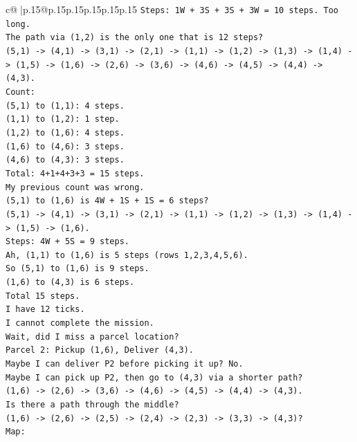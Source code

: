 \documentclass{article}
\begin{document}
{\begin{supertabular}{c@{$\;$}|p{.15\linewidth}@{}p{.15\linewidth}p{.15\linewidth}p{.15\linewidth}p{.15\linewidth}p{.15\linewidth}}
{{{\texttt{Steps: 1W + 3S + 3S + 3W = 10 steps. Too long.} \\
\texttt{The path via (1,2) is the only one that is 12 steps?} \\
\texttt{(5,1) {-}> (4,1) {-}> (3,1) {-}> (2,1) {-}> (1,1) {-}> (1,2) {-}> (1,3) {-}> (1,4) {-}> (1,5) {-}> (1,6) {-}> (2,6) {-}> (3,6) {-}> (4,6) {-}> (4,5) {-}> (4,4) {-}> (4,3).} \\
\texttt{Count:} \\
\texttt{(5,1) to (1,1): 4 steps.} \\
\texttt{(1,1) to (1,2): 1 step.} \\
\texttt{(1,2) to (1,6): 4 steps.} \\
\texttt{(1,6) to (4,6): 3 steps.} \\
\texttt{(4,6) to (4,3): 3 steps.} \\
\texttt{Total: 4+1+4+3+3 = 15 steps.} \\
\texttt{My previous count was wrong.} \\
\texttt{(5,1) to (1,6) is 4W + 1S + 1S = 6 steps?} \\
\texttt{(5,1) {-}> (4,1) {-}> (3,1) {-}> (2,1) {-}> (1,1) {-}> (1,2) {-}> (1,3) {-}> (1,4) {-}> (1,5) {-}> (1,6).} \\
\texttt{Steps: 4W + 5S = 9 steps.} \\
\texttt{Ah, (1,1) to (1,6) is 5 steps (rows 1,2,3,4,5,6).} \\
\texttt{So (5,1) to (1,6) is 9 steps.} \\
\texttt{(1,6) to (4,3) is 6 steps.} \\
\texttt{Total 15 steps.} \\
\texttt{I have 12 ticks.} \\
\texttt{I cannot complete the mission.} \\
\texttt{Wait, did I miss a parcel location?} \\
\texttt{Parcel 2: Pickup (1,6), Deliver (4,3).} \\
\texttt{Maybe I can deliver P2 before picking it up? No.} \\
\texttt{Maybe I can pick up P2, then go to (4,3) via a shorter path?} \\
\texttt{(1,6) {-}> (2,6) {-}> (3,6) {-}> (4,6) {-}> (4,5) {-}> (4,4) {-}> (4,3).} \\
\texttt{Is there a path through the middle?} \\
\texttt{(1,6) {-}> (2,6) {-}> (2,5) {-}> (2,4) {-}> (2,3) {-}> (3,3) {-}> (4,3)?} \\
\texttt{Map:} \\
}}}
\end{supertabular}}
\end{document}
